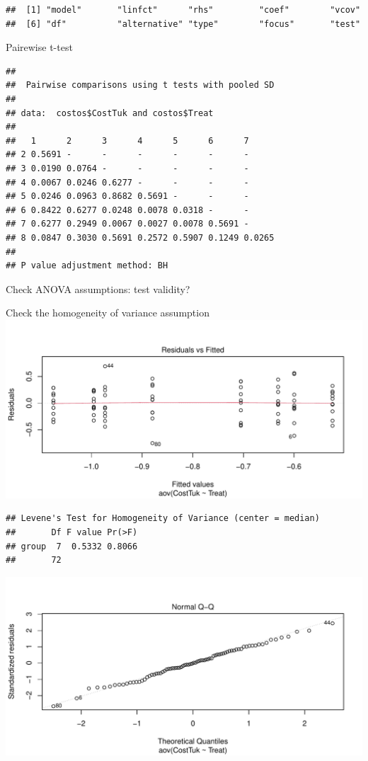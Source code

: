 \documentclass[
  11pt,
]{article}
\begin{document}
\begin{verbatim}
##  [1] "model"       "linfct"      "rhs"         "coef"        "vcov"       
##  [6] "df"          "alternative" "type"        "focus"       "test"
\end{verbatim}

Pairewise t-test

\begin{verbatim}
## 
##  Pairwise comparisons using t tests with pooled SD 
## 
## data:  costos$CostTuk and costos$Treat 
## 
##   1      2      3      4      5      6      7     
## 2 0.5691 -      -      -      -      -      -     
## 3 0.0190 0.0764 -      -      -      -      -     
## 4 0.0067 0.0246 0.6277 -      -      -      -     
## 5 0.0246 0.0963 0.8682 0.5691 -      -      -     
## 6 0.8422 0.6277 0.0248 0.0078 0.0318 -      -     
## 7 0.6277 0.2949 0.0067 0.0027 0.0078 0.5691 -     
## 8 0.0847 0.3030 0.5691 0.2572 0.5907 0.1249 0.0265
## 
## P value adjustment method: BH
\end{verbatim}

Check ANOVA assumptions: test validity?

Check the homogeneity of variance assumption
\includegraphics{def_files/figure-latex/unnamed-chunk-25-1.pdf}

\begin{verbatim}
## Levene's Test for Homogeneity of Variance (center = median)
##       Df F value Pr(>F)
## group  7  0.5332 0.8066
##       72
\end{verbatim}

\includegraphics{def_files/figure-latex/unnamed-chunk-27-1.pdf}
\end{document}
